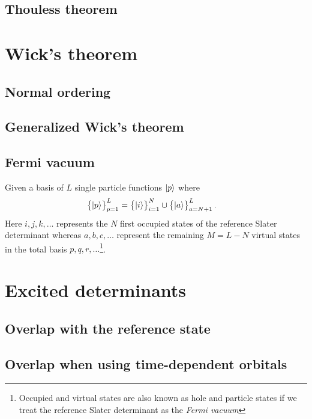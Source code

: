         \subsection{Thouless theorem}



    \section{Wick's theorem}
        \subsection{Normal ordering}
        \subsection{Generalized Wick's theorem}
        \subsection{Fermi vacuum}
            \label{sec:fermi-vacuum}
            Given a basis of $L$ single particle functions $\ket{p}$ where
            \begin{align}
                \left\{\ket{p}\right\}_{p = 1}^{L}
                &=
                \left\{\ket{i}\right\}_{i = 1}^{N}
                \cup \left\{\ket{a}\right\}_{a = N + 1}^{L}.
            \end{align}
            Here $i, j, k, \dots$ represents the $N$ first occupied states of
            the reference Slater determinant whereas $a, b, c, \dots$ represent
            the remaining $M = L - N$ virtual states in the total basis $p, q,
            r, \dots$\footnote{Occupied and virtual states are also known as
            hole and particle states if we treat the reference Slater
            determinant as the \textit{Fermi vacuum}}.

    \section{Excited determinants}
        \subsection{Overlap with the reference state}
        \subsection{Overlap when using time-dependent orbitals}

